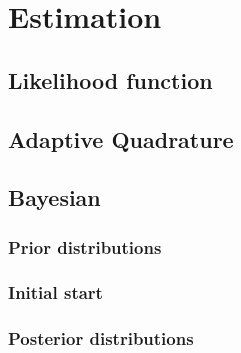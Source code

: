\chapter{Estimation}

\section{Likelihood function}


\section{Adaptive Quadrature}


\section{Bayesian}

\subsection{Prior distributions}

\subsection{Initial start}

\subsection{Posterior distributions}


